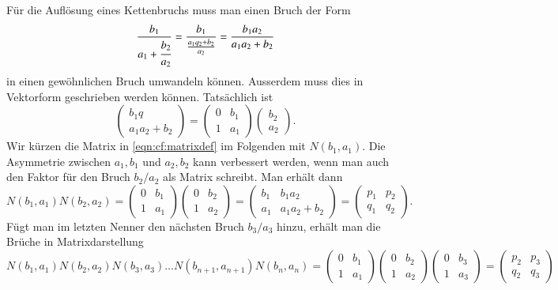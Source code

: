 Für die Auflösung eines Kettenbruchs muss man einen Bruch der Form
\[
\frac{b_1}{a_1+\cfrac{b_2}{a_2}}
=
\frac{b_1}{\frac{a_1q_2+b_2}{a_2}}
=
\frac{b_1a_2}{a_1a_2+b_2}
\]
in einen gewöhnlichen Bruch umwandeln können.
Ausserdem muss dies in Vektorform geschrieben werden können.
Tatsächlich ist
\begin{equation}
\begin{pmatrix}
b_1q\\
a_1a_2+b_2
\end{pmatrix}
=
\begin{pmatrix}
0&b_1\\
1&a_1
\end{pmatrix}
\begin{pmatrix}
b_2\\a_2
\end{pmatrix}.
\label{eqn:cf:matrixdef}
\end{equation}
Wir kürzen die Matrix in \eqref{eqn:cf:matrixdef} im Folgenden
mit $N(b_1,a_1)$.
Die Asymmetrie zwischen $a_1,b_1$ und $a_2,b_2$ kann verbessert werden, 
wenn man auch den Faktor für den Bruch $b_2/a_2$ als Matrix schreibt.
Man erhält dann
\[
N(b_1,a_1)
N(b_2,a_2)
=
\begin{pmatrix}
0&b_1\\
1&a_1
\end{pmatrix}
\begin{pmatrix}
0&b_2\\
1&a_2
\end{pmatrix}
=
\begin{pmatrix}
b_1&b_1a_2    \\
a_1&a_1a_2+b_2
\end{pmatrix}
=
\begin{pmatrix}
p_1&p_2\\
q_1&q_2
\end{pmatrix}.
\]
Fügt man im letzten Nenner den nächsten Bruch $b_3/a_3$ hinzu, erhält man
die Brüche in Matrixdarstellung
\[
N(b_1,a_1)
N(b_2,a_2)
N(b_3,a_3)
\dots
N(b_{n+1},a_{n+1})
N(b_n,a_n)
=
\begin{pmatrix}
0&b_1\\
1&a_1
\end{pmatrix}
\begin{pmatrix}
0&b_2\\
1&a_2
\end{pmatrix}
\begin{pmatrix}
0&b_3\\
1&a_3
\end{pmatrix}
=
\begin{pmatrix}
p_2&p_3\\
q_2&q_3
\end{pmatrix}
\]
